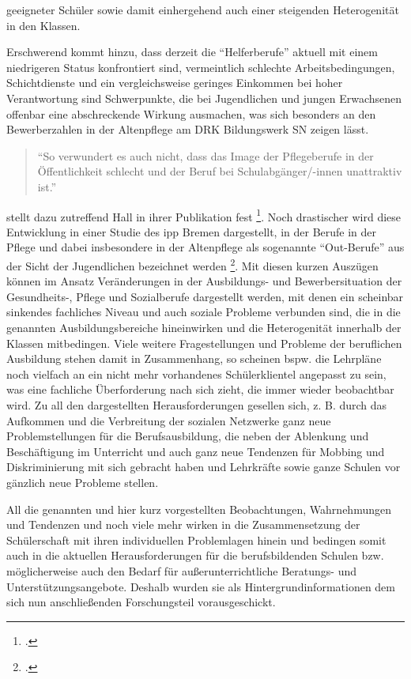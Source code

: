 geeigneter Schüler sowie damit einhergehend auch einer steigenden Heterogenität in den Klassen. 

Erschwerend kommt hinzu, dass derzeit die "`Helferberufe"' aktuell mit einem niedrigeren Status konfrontiert sind, vermeintlich schlechte Arbeitsbedingungen, Schichtdienste und ein vergleichsweise geringes Einkommen bei hoher Verantwortung sind Schwerpunkte, die bei Jugendlichen und jungen Erwachsenen offenbar eine abschreckende Wirkung ausmachen, was sich besonders an den Bewerberzahlen in der Altenpflege am DRK Bildungswerk SN zeigen lässt. 

\begin{quotation}
\noindent
"`So verwundert es auch nicht, dass das Image der Pflegeberufe in der Öffentlichkeit schlecht und der Beruf bei Schulabgänger/-innen unattraktiv ist."'
\end{quotation}

\noindent 
[\punkte] stellt dazu zutreffend Hall in ihrer Publikation fest \footcite[19]{Hall2012}. Noch drastischer wird diese Entwicklung in einer Studie des ipp Bremen dargestellt, in der Berufe in der Pflege und dabei insbesondere in der Altenpflege als sogenannte "`Out-Berufe"' aus der Sicht der Jugendlichen bezeichnet werden \footcite[18]{BPHP2010}. Mit diesen kurzen Auszügen können im Ansatz Veränderungen in der Ausbildungs- und Bewerbersituation der Gesundheits-, Pflege und Sozialberufe dargestellt werden, mit denen ein scheinbar sinkendes fachliches Niveau und auch soziale Probleme verbunden sind, die in die genannten Ausbildungsbereiche hineinwirken und die Heterogenität innerhalb der Klassen mitbedingen. Viele weitere Fragestellungen und Probleme der beruflichen Ausbildung stehen damit in Zusammenhang, so scheinen bspw. die Lehrpläne noch vielfach an ein nicht mehr vorhandenes Schülerklientel angepasst zu sein, was eine fachliche Überforderung nach sich zieht, die immer wieder beobachtbar wird. Zu all den dargestellten Herausforderungen gesellen sich, z. B. durch das Aufkommen und die Verbreitung der sozialen Netzwerke ganz neue Problemstellungen für die Berufsausbildung, die neben der Ablenkung und Beschäftigung im Unterricht und auch ganz neue Tendenzen für Mobbing und Diskriminierung mit sich gebracht haben und Lehrkräfte sowie ganze Schulen vor gänzlich neue Probleme stellen.

All die genannten und hier kurz vorgestellten Beobachtungen, Wahrnehmungen und Tendenzen und noch viele mehr wirken in die Zusammensetzung der Schülerschaft mit ihren individuellen Problemlagen hinein und bedingen somit auch in die aktuellen Herausforderungen für die berufsbildenden Schulen bzw. möglicherweise auch den Bedarf für außerunterrichtliche Beratungs- und Unterstützungsangebote. Deshalb wurden sie als Hintergrundinformationen dem sich nun anschließenden Forschungsteil vorausgeschickt. 
